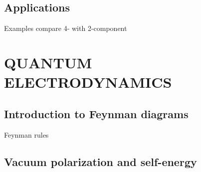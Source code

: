 \documentclass[12pt]{article}
\begin{document}
\subsection{\sffamily Applications}
Examples compare 4- with 2-component

\section{\label{QED} \sffamily \Large QUANTUM ELECTRODYNAMICS}

\subsection{\sffamily Introduction to Feynman diagrams}
Feynman rules

\subsection{\sffamily Vacuum polarization and self-energy}
\end{document}
